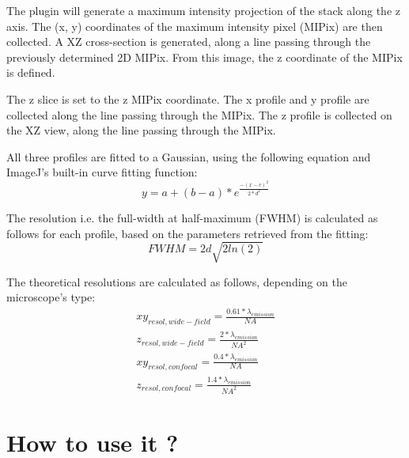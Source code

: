 \documentclass[a4paper, 11pt]{report}%
\begin{document}
\begin{enumerate*}
	\item The plugin will generate a maximum intensity projection of the stack along the z axis. The (x, y) coordinates of the maximum intensity pixel (MIPix) are then collected. A XZ cross-section is generated, along a line passing through the previously determined 2D MIPix. From this image, the z coordinate of the MIPix is defined.
	\item The z slice is set to the z MIPix coordinate. The x profile and y profile are collected along the line passing through the MIPix. The z profile is collected on the XZ view, along the line passing through the MIPix.
	\item All three profiles are fitted to a Gaussian, using the following equation and ImageJ's built-in curve fitting function:
		\begin{equation}
			y = a + (b-a)*e^{\frac{-(x-c)^{2}}{2*d^{2}}}
			\label{eqn:gpr-gaussian}
		\end{equation}
	\item The resolution i.e. the full-width at half-maximum (FWHM) is calculated as follows for each profile, based on the parameters retrieved from the fitting:
	\begin{equation}
		FWHM=2d\sqrt{2ln(2)}
		\label{eqn:gpr-FWHM}
	\end{equation}
	\item The theoretical resolutions are calculated as follows, depending on the microscope's type:
		\begin{eqnarray}
			xy_{resol, wide-field}=\frac{0.61*\lambda_{emission}}{NA}
			\label{eqn:gpr-xyWF}\\
			z_{resol, wide-field}=\frac{2*\lambda_{emission}}{NA^2}
			\label{eqn:gpr-zWF}\\
			xy_{resol, confocal}=\frac{0.4*\lambda_{emission}}{NA}
			\label{eqn:gpr-xyConf}\\
			z_{resol, confocal}=\frac{1.4*\lambda_{emission}}{NA^2}
			\label{eqn:gpr-zConf}
		\end{eqnarray}
\end{enumerate*}

\section{How to use it ?}
\label{sec:gpr-how}
\end{document}
